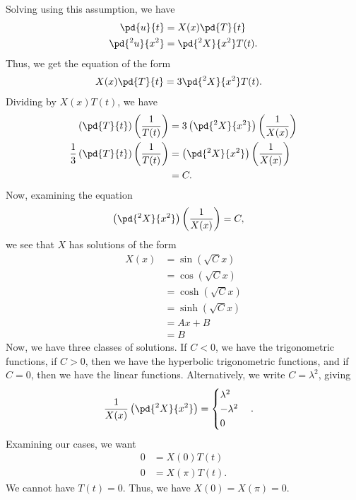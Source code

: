 \documentclass[10pt]{mypackage}
\begin{document}
\begin{example}
  Solving using this assumption, we have
  \begin{align*}
    \pd{u}{t} &= X(x)\pd{T}{t}\\
    \pd{^2u}{x^2} &= \pd{^2X}{x^2}T(t).
  \end{align*}
  Thus, we get the equation of the form
  \begin{align*}
    X(x) \pd{T}{t} &= 3 \pd{^2X}{x^2}T(t).
  \end{align*}
  Dividing by $X(x)T(t)$, we have
  \begin{align*}
    \left( \pd{T}{t} \right)\left( \frac{1}{T(t)}  \right) &= 3 \left( \pd{^2X}{x^2} \right)\left( \frac{1}{X(x)} \right)\\
    \frac{1}{3}\left( \pd{T}{t} \right)\left( \frac{1}{T(t)} \right) &= \left( \pd{^2X}{x^2} \right)\left( \frac{1}{X(x)} \right)\\
                                                                     &= C.
  \end{align*}
  Now, examining the equation
  \begin{align*}
    \left( \pd{^2 X}{x^2} \right)\left( \frac{1}{X(x)} \right) &= C,
  \end{align*}
  we see that $X$ has solutions of the form
  \begin{align*}
    X(x) &= \sin\left( \sqrt{C}x \right)\\
         &= \cos\left( \sqrt{C}x \right)\\
         &= \cosh\left( \sqrt{C}x \right)\\
         &= \sinh\left( \sqrt{C}x \right)\\
         &= Ax + B\\
         &= B
  \end{align*}
  Now, we have three classes of solutions. If $C < 0$, we have the trigonometric functions, if $C > 0$, then we have the hyperbolic trigonometric functions, and if $C = 0$, then we have the linear functions. Alternatively, we write $C = \lambda^2$, giving
  \begin{align*}
    \frac{1}{X(x)} \left( \pd{^2X}{x^2} \right) &= \begin{cases}
      \lambda^2\\ -\lambda^2 \\ 0
    \end{cases}.
  \end{align*}
  Examining our cases, we want
  \begin{align*}
    0 &= X(0)T(t)\\
    0 &= X(\pi)T(t).
  \end{align*}
  We cannot have $T(t) = 0$. Thus, we have $X(0) = X(\pi) = 0$.\newline


\end{example}
\end{document}
